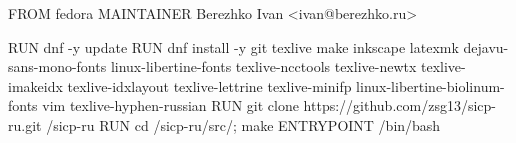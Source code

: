 FROM fedora
MAINTAINER Berezhko Ivan <ivan@berezhko.ru>

RUN dnf -y update
RUN dnf install -y git texlive make inkscape latexmk dejavu-sans-mono-fonts linux-libertine-fonts texlive-ncctools texlive-newtx texlive-imakeidx texlive-idxlayout texlive-lettrine texlive-minifp linux-libertine-biolinum-fonts vim texlive-hyphen-russian
RUN git clone https://github.com/zsg13/sicp-ru.git /sicp-ru
RUN cd /sicp-ru/src/; make
ENTRYPOINT /bin/bash
